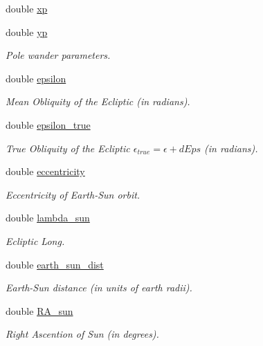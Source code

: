 \begin{CompactItemize}
double \hyperlink{struct_lgm___c_trans_f649efec4c4f51f4db0ebb935a83d015}{xp}
\item 
double \hyperlink{struct_lgm___c_trans_7841edcbdbfea2b400dea7753dcfac9e}{yp}
\begin{CompactList}\small\item\em Pole wander parameters. \item\end{CompactList}\item 
double \hyperlink{struct_lgm___c_trans_4904cc82627458fdf6672ccc0b2802c7}{epsilon}
\begin{CompactList}\small\item\em Mean Obliquity of the Ecliptic (in radians). \item\end{CompactList}\item 
double \hyperlink{struct_lgm___c_trans_a8bf1178f8d7700b7ba6752dd3a0fe0d}{epsilon\_\-true}
\begin{CompactList}\small\item\em True Obliquity of the Ecliptic $\epsilon_{true} = \epsilon + dEps$ (in radians). \item\end{CompactList}\item 
double \hyperlink{struct_lgm___c_trans_4daf524c969da993dc09f2b3c8d56173}{eccentricity}
\begin{CompactList}\small\item\em Eccentricity of Earth-Sun orbit. \item\end{CompactList}\item 
double \hyperlink{struct_lgm___c_trans_bfeab9ab1ea1f52c6b33a0794809d62a}{lambda\_\-sun}
\begin{CompactList}\small\item\em Ecliptic Long. \item\end{CompactList}\item 
double \hyperlink{struct_lgm___c_trans_25ad562558907e5ad4aad47740092522}{earth\_\-sun\_\-dist}
\begin{CompactList}\small\item\em Earth-Sun distance (in units of earth radii). \item\end{CompactList}\item 
double \hyperlink{struct_lgm___c_trans_ebb1769343863f3c66a44cc6f97ea836}{RA\_\-sun}
\begin{CompactList}\small\item\em Right Ascention of Sun (in degrees). \item\end{CompactList}\item 

\end{CompactItemize}
